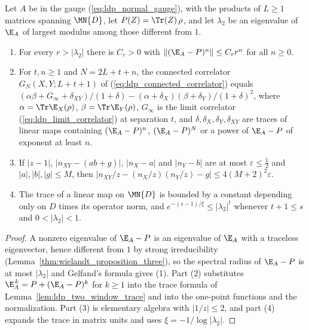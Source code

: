\begin{lemma}
    \label{lem:ldp_finite_size_correction}
    \leanok
    Let $A$ be in the gauge (\ref{eq:ldp_normal_gauge}), with the products of
    $L\ge1$ matrices spanning $\MN{D}$, let $P(Z)=\Tr(Z)\,\rho$, and let
    $\lambda_2$ be an eigenvalue of $\E_A$ of largest modulus among those
    different from $1$.
    \begin{enumerate}
        \item For every $r>\lvert\lambda_2\rvert$ there is $C_r>0$ with
              $\lVert(\E_A-P)^n\rVert\le C_rr^n$ for all $n\ge0$.
        \item For $t,n\ge1$ and $N=2L+t+n$, the connected correlator
              $G_N(X,Y;L+t+1)$ of (\ref{eq:ldp_connected_correlator}) equals
              $(\alpha\beta+G_\infty+\delta_{XY})/(1+\delta)
                  -(\alpha+\delta_X)(\beta+\delta_Y)/(1+\delta)^2$, where
              $\alpha=\Tr\E_X(\rho)$, $\beta=\Tr\E_Y(\rho)$, $G_\infty$ is the
              limit correlator (\ref{eq:ldp_limit_correlator}) at
              separation $t$, and $\delta,\delta_X,\delta_Y,\delta_{XY}$ are
              traces of linear maps containing $(\E_A-P)^n$, $(\E_A-P)^N$ or a
              power of $\E_A-P$ of exponent at least $n$.
        \item If $\lvert z-1\rvert$, $\lvert n_{XY}-(ab+g)\rvert$,
              $\lvert n_X-a\rvert$ and $\lvert n_Y-b\rvert$ are at most
              $\varepsilon\le\tfrac12$ and $\lvert a\rvert,\lvert b\rvert,
                  \lvert g\rvert\le M$, then
              $\lvert n_{XY}/z-(n_X/z)(n_Y/z)-g\rvert\le4(M+2)^2\varepsilon$.
        \item The trace of a linear map on $\MN{D}$ is bounded by a constant
              depending only on $D$ times its operator norm, and
              $e^{-(s-1)/\xi}\le\lvert\lambda_2\rvert^t$ whenever $t+1\le s$ and
              $0<\lvert\lambda_2\rvert<1$.
    \end{enumerate}
\end{lemma}
\begin{proof}
    \leanok
    A nonzero eigenvalue of $\E_A-P$ is an eigenvalue of $\E_A$ with a traceless
    eigenvector, hence different from $1$ by strong irreducibility
    (Lemma~\ref{thm:wielandt_proposition_three}), so the spectral radius of
    $\E_A-P$ is at most $\lvert\lambda_2\rvert$ and Gelfand's formula gives
    (1). Part (2) substitutes $\E_A^{\,k}=P+(\E_A-P)^k$ for $k\ge1$ into the
    trace formula of Lemma~\ref{lem:ldp_two_window_trace} and into the
    one-point functions and the normalization. Part (3) is elementary
    algebra with $\lvert1/z\rvert\le2$, and part (4) expands the trace in
    matrix units and uses $\xi=-1/\log\lvert\lambda_2\rvert$.
\end{proof}

